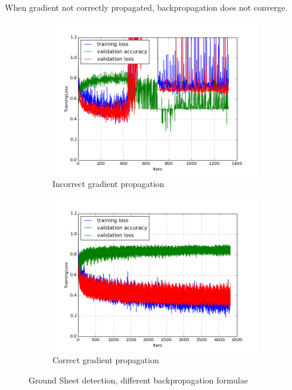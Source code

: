 \documentclass[a4paper,11pt]{article}
\begin{document}
When gradient not correctly propagated, backpropagation does not converge. \\

\begin{figure}
    \centering
    \begin{minipage}[b]{\textwidth}
      \begin{subfigure}{.5\textwidth} 
        \centering
        \includegraphics[scale=0.4]{images/plot_ground_sheet_sbl_pcba.png}
        \caption{Incorrect gradient propagation}\label{fig:2a}
      \end{subfigure}%
      \begin{subfigure}{.5\textwidth} 
        \centering
        \includegraphics[scale=0.4]{images/plot_ground_sheet_sbl_pcba_all_backprop.png}
        \caption{Correct gradient propagation}\label{fig:2b}
      \end{subfigure} \par \vspace*{20pt} %
      \caption{Ground Sheet detection, different backpropagation formulae}\label{fig:2}
    \end{minipage}%
\end{figure}
\end{document}
